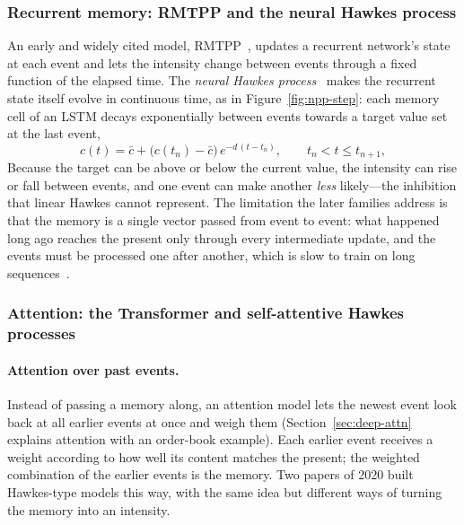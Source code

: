 \subsubsection{Recurrent memory: RMTPP and the neural Hawkes process}
\label{sec:npp-rnn}

An early and widely cited model, RMTPP~\citep{du2016rmtpp}, updates a recurrent network's state at each event and
lets the intensity change between events through a fixed function of the elapsed time. The \emph{neural Hawkes
process}~\citep{mei2017} makes the recurrent state itself evolve in continuous time, as in
Figure~\ref{fig:npp-step}: each memory cell of an LSTM decays exponentially between events towards a target value
set at the last event,
\begin{equation}
c(t) = \bar c + \bigl(c(t_n) - \bar c\bigr)\, e^{-d\,(t - t_n)}, \qquad t_n < t \le t_{n+1},
\label{eq:ctlstm-decay}
\end{equation}
Because the target can be above or below the current value, the intensity can rise or fall between events, and
one event can make another \emph{less} likely---the inhibition that linear Hawkes cannot represent. The
limitation the later families address is that the memory is a single vector passed from event to event: what
happened long ago reaches the present only through every intermediate update, and the events must be processed
one after another, which is slow to train on long sequences~\citep{zuo2020thp}.

\subsubsection{Attention: the Transformer and self-attentive Hawkes processes}
\label{sec:npp-attn}

\paragraph{Attention over past events.} Instead of passing a memory along, an attention model lets the newest event look back at all
earlier events at once and weigh them (Section~\ref{sec:deep-attn} explains attention with an order-book
example). Each earlier event receives a weight according to how well its content matches the present; the
weighted combination of the earlier events is the memory. Two papers of 2020 built Hawkes-type models this way,
with the same idea but different ways of turning the memory into an intensity.

